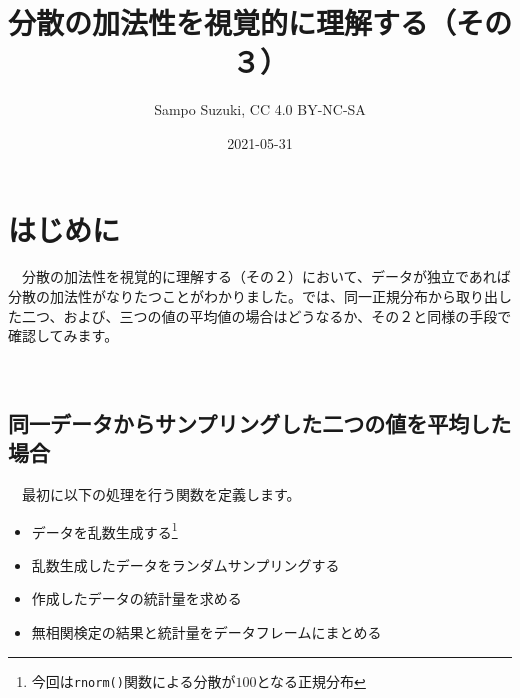 \documentclass[]{tufte-handout}
\title[分散の加法性を視覚的に理解する（その３）]{分散の加法性を視覚的に理解する（その３）}
\author{Sampo Suzuki, CC 4.0 BY-NC-SA}
\date{2021-05-31}
\providecommand{\tightlist}{%
  \setlength{\itemsep}{0pt}\setlength{\parskip}{0pt}}
\begin{document}
\maketitle




\hypertarget{ux306fux3058ux3081ux306b}{%
\section{\texorpdfstring{\textbf{はじめに}}{はじめに}}\label{ux306fux3058ux3081ux306b}}

　分散の加法性を視覚的に理解する（その２）において、データが独立であれば分散の加法性がなりたつことがわかりました。では、同一正規分布から取り出した二つ、および、三つの値の平均値の場合はどうなるか、その２と同様の手段で確認してみます。

　

\hypertarget{ux540cux4e00ux30c7ux30fcux30bfux304bux3089ux30b5ux30f3ux30d7ux30eaux30f3ux30b0ux3057ux305fux4e8cux3064ux306eux5024ux3092ux5e73ux5747ux3057ux305fux5834ux5408}{%
\subsection{\texorpdfstring{\textbf{同一データからサンプリングした二つの値を平均した場合}}{同一データからサンプリングした二つの値を平均した場合}}\label{ux540cux4e00ux30c7ux30fcux30bfux304bux3089ux30b5ux30f3ux30d7ux30eaux30f3ux30b0ux3057ux305fux4e8cux3064ux306eux5024ux3092ux5e73ux5747ux3057ux305fux5834ux5408}}

　最初に以下の処理を行う関数を定義します。

\begin{itemize}
\tightlist
\item
  データを乱数生成する\footnote{今回は\texttt{rnorm()}関数による分散が\(100\)となる正規分布}
\item
  乱数生成したデータをランダムサンプリングする
\item
  作成したデータの統計量を求める
\item
  無相関検定の結果と統計量をデータフレームにまとめる
\end{itemize}
\end{document}
